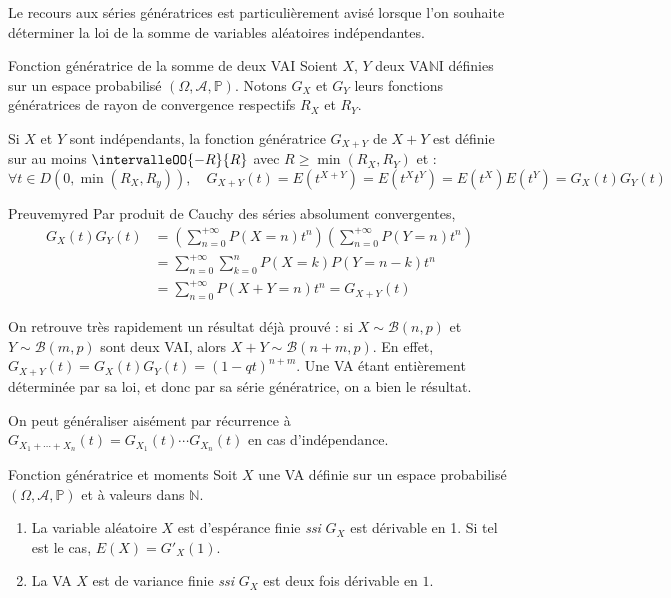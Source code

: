     Le recours aux séries génératrices est particulièrement avisé lorsque l’on souhaite déterminer la loi de la somme de variables aléatoires indépendantes. 

    \begin{theo}{Fonction génératrice de la somme de deux VAI}{}
        Soient $X$, $Y$ deux VA$\mathbb{N}$I définies sur un espace probabilisé $(\Omega, \mathcal{A}, \mathbb{P})$. Notons $G_X$ et $G_Y$ leurs fonctions génératrices de rayon de convergence respectifs $R_X$ et $R_Y$. 

        Si $X$ et $Y$ sont indépendants, la fonction génératrice $G_{X + Y}$ de $X + Y$ est définie sur au moins $\intervalleOO{-R}{R}$ avec $R \geq \min(R_X, R_Y)$ et :
        \[ \forall t \in D(0,\min(R_X,R_y)), \quad G_{X+Y}(t) = E(t^{X + Y}) = E(t^X t^Y) = E(t^X)E(t^Y) = G_X(t) G_Y(t) \]   
    \end{theo}

    \begin{demo}{Preuve}{myred}
        Par produit de Cauchy des séries absolument convergentes, 
        \begin{align}
            G_X(t)G_Y(t) 
            &= \left(\sum_{n=0}^{+\infty} P(X=n) t^n\right)\left(\sum_{n=0}^{+\infty} P(Y = n) t^n\right) \\
            &= \sum_{n=0}^{+\infty} \sum_{k=0}^{n} P(X = k) P(Y = n - k) t^n \\
            &= \sum_{n=0}^{+\infty} P(X+Y = n)t^n = G_{X + Y}(t)
        \end{align}
    \end{demo}

    On retrouve très rapidement un résultat déjà prouvé : si $X \sim \mathcal{B}(n,p)$ et $Y \sim \mathcal{B}(m,p)$ sont deux VAI, alors $X + Y \sim \mathcal{B}(n+m,p)$. En effet, $G_{X+Y}(t) = G_X(t) G_Y(t) = (1 - qt)^{n + m}$. Une VA étant entièrement déterminée par sa loi, et donc par sa série génératrice, on a bien le résultat.

    On peut généraliser aisément par récurrence à $G_{X_1 + \cdots + X_n}(t) = G_{X_1}(t) \cdots G_{X_n}(t)$ en cas d’indépendance.

    \begin{theo}{Fonction génératrice et moments}{}
        Soit $X$ une VA définie sur un espace probabilisé $(\Omega, \mathcal{A}, \mathbb{P})$ et à valeurs dans $\mathbb{N}$. 
        \begin{enumerate}
            \item La variable aléatoire $X$ est d’espérance finie \textit{ssi} $G_X$ est dérivable en 1. Si tel est le cas, $E(X) = G'_X(1)$. 
            \item La VA $X$ est de variance finie \textit{ssi} $G_X$ est deux fois dérivable en $1$.
        \end{enumerate}
    \end{theo}

